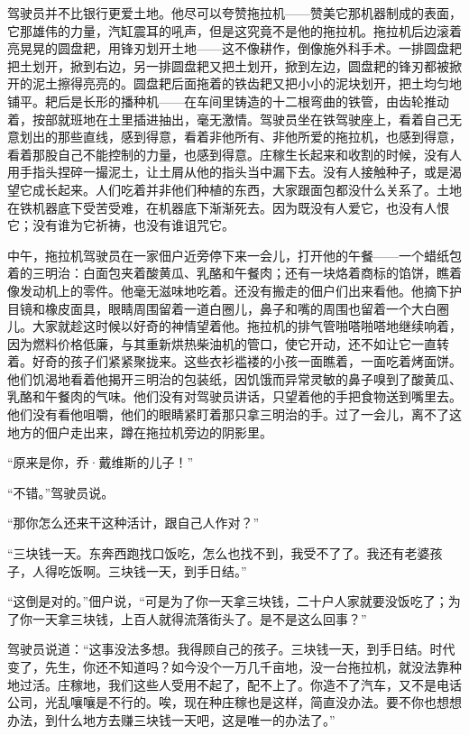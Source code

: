 \documentclass[12pt,UTF-8,openany]{ctexbook}
\begin{document}
\begin{normalsize}
    驾驶员并不比银行更爱土地。他尽可以夸赞拖拉机——赞美它那机器制成的表面，它那雄伟的力量，汽缸震耳的吼声，但是这究竟不是他的拖拉机。拖拉机后边滚着亮晃晃的圆盘耙，用锋刃划开土地——这不像耕作，倒像施外科手术。一排圆盘耙把土划开，掀到右边，另一排圆盘耙又把土划开，掀到左边，圆盘耙的锋刃都被掀开的泥土擦得亮亮的。圆盘耙后面拖着的铁齿耙又把小小的泥块划开，把土均匀地铺平。耙后是长形的播种机——在车间里铸造的十二根弯曲的铁管，由齿轮推动着，按部就班地在土里插进抽出，毫无激情。驾驶员坐在铁驾驶座上，看着自己无意划出的那些直线，感到得意，看着非他所有、非他所爱的拖拉机，也感到得意，看着那股自己不能控制的力量，也感到得意。庄稼生长起来和收割的时候，没有人用手指头捏碎一撮泥土，让土屑从他的指头当中漏下去。没有人接触种子，或是渴望它成长起来。人们吃着并非他们种植的东西，大家跟面包都没什么关系了。土地在铁机器底下受苦受难，在机器底下渐渐死去。因为既没有人爱它，也没有人恨它；没有谁为它祈祷，也没有谁诅咒它。
    
    中午，拖拉机驾驶员在一家佃户近旁停下来一会儿，打开他的午餐——一个蜡纸包着的三明治：白面包夹着酸黄瓜、乳酪和午餐肉；还有一块烙着商标的馅饼，瞧着像发动机上的零件。他毫无滋味地吃着。还没有搬走的佃户们出来看他。他摘下护目镜和橡皮面具，眼睛周围留着一道白圈儿，鼻子和嘴的周围也留着一个大白圈儿。大家就趁这时候以好奇的神情望着他。拖拉机的排气管啪嗒啪嗒地继续响着，因为燃料价格低廉，与其重新烘热柴油机的管口，使它开动，还不如让它一直转着。好奇的孩子们紧紧聚拢来。这些衣衫褴褛的小孩一面瞧着，一面吃着烤面饼。他们饥渴地看着他揭开三明治的包装纸，因饥饿而异常灵敏的鼻子嗅到了酸黄瓜、乳酪和午餐肉的气味。他们没有对驾驶员讲话，只望着他的手把食物送到嘴里去。他们没有看他咀嚼，他们的眼睛紧盯着那只拿三明治的手。过了一会儿，离不了这地方的佃户走出来，蹲在拖拉机旁边的阴影里。
    
    “原来是你，乔·戴维斯的儿子！”
    
    “不错。”驾驶员说。
    
    “那你怎么还来干这种活计，跟自己人作对？”
    
    “三块钱一天。东奔西跑找口饭吃，怎么也找不到，我受不了了。我还有老婆孩子，人得吃饭啊。三块钱一天，到手日结。”
    
    “这倒是对的。”佃户说，“可是为了你一天拿三块钱，二十户人家就要没饭吃了；为了你一天拿三块钱，上百人就得流落街头了。是不是这么回事？”
    
    驾驶员说道：“这事没法多想。我得顾自己的孩子。三块钱一天，到手日结。时代变了，先生，你还不知道吗？如今没个一万几千亩地，没一台拖拉机，就没法靠种地过活。庄稼地，我们这些人受用不起了，配不上了。你造不了汽车，又不是电话公司，光乱嚷嚷是不行的。唉，现在种庄稼也是这样，简直没办法。要不你也想想办法，到什么地方去赚三块钱一天吧，这是唯一的办法了。”
    

\end{normalsize}
\end{document}
